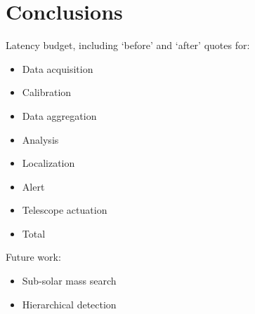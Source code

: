 \section{Conclusions}
\label{SECV}\label{sec:conclusions}

Latency budget, including `before' and `after' quotes for:

\begin{itemize}
\item Data acquisition
\item Calibration
\item Data aggregation
\item Analysis
\item Localization
\item Alert
\item Telescope actuation
\item Total
\end{itemize}

Future work:

\begin{itemize}
\item Sub-solar mass search
\item Hierarchical detection
\end{itemize}
